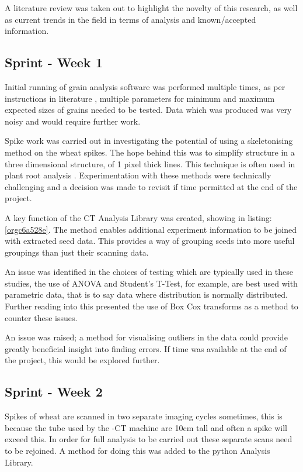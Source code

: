 \documentclass[11pt]{report}
\begin{document}
A literature review was taken out to highlight the novelty of this research, as well as current trends in the field in terms of analysis and known/accepted information.

\subsection{Sprint - Week 1}
\label{sec:org2865548}

Initial running of grain analysis software was performed multiple times, as per instructions in literature \cite{Hughes2017}, multiple parameters for minimum and maximum expected sizes of grains needed to be tested. Data which was produced was very noisy and would require further work.

Spike work was carried out in investigating the potential of using a skeletonising method on the wheat spikes. The hope behind this was to simplify structure in a three dimensional structure, of 1 pixel thick lines. This technique is often used in plant root analysis \cite{Mairhofer2015,Daly2017}. Experimentation with these methods were technically challenging and a decision was made to revisit if time permitted at the end of the project.

A key function of the CT Analysis Library was created, showing in listing:\ref{orgc6a528e}. The method enables additional experiment information to be joined with extracted seed data. This provides a way of grouping seeds into more useful groupings than just their scanning data.

An issue was identified in the choices of testing which are typically used in these studies, the use of ANOVA and Student's T-Test, for example, are best used with parametric data, that is to say data where distribution is normally distributed. Further reading into this presented the use of Box Cox transforms as a method to counter these issues.

An issue was raised; a method for visualising outliers in the data could provide greatly beneficial insight into finding errors. If time was available at the end of the project, this would be explored further.

\subsection{Sprint - Week 2}
\label{sec:orgc910e38}

Spikes of wheat are scanned in two separate imaging cycles sometimes, this is because the tube used by the \textmu{}-CT machine are 10cm tall and often a spike will exceed this. In order for full analysis to be carried out these separate scans need to be rejoined. A method for doing this was added to the python Analysis Library.
\end{document}
